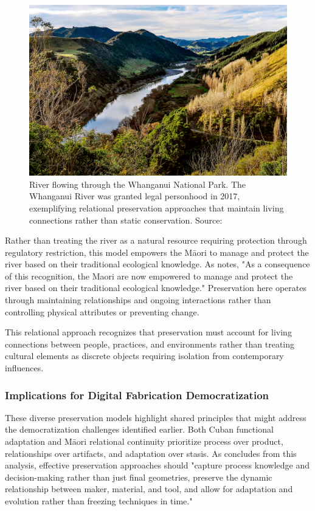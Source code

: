 \begin{figure}[H]
\centering
\includegraphics[width=1\textwidth]{figures/chapter2/whanganui.jpg}
\caption{River flowing through the Whanganui National Park. The Whanganui River was granted legal personhood in 2017, exemplifying relational preservation approaches that maintain living connections rather than static conservation. Source: \citet{paremata2017}}
\label{fig:whanganui_river}
\end{figure}

Rather than treating the river as a natural resource requiring protection through regulatory restriction, this model empowers the Māori to manage and protect the river based on their traditional ecological knowledge. As \citet{vijaykuma2019} notes, "As a consequence of this recognition, the Maori are now empowered to manage and protect the river based on their traditional ecological knowledge." Preservation here operates through maintaining relationships and ongoing interactions rather than controlling physical attributes or preventing change.

\vspace{0.5cm}

This relational approach recognizes that preservation must account for living connections between people, practices, and environments rather than treating cultural elements as discrete objects requiring isolation from contemporary influences.

\subsubsection{Implications for Digital Fabrication Democratization}

These diverse preservation models highlight shared principles that might address the democratization challenges identified earlier. Both Cuban functional adaptation and Māori relational continuity prioritize process over product, relationships over artifacts, and adaptation over stasis. As \citet{munoz_zanon_2025_16211937} concludes from this analysis, effective preservation approaches should "capture process knowledge and decision-making rather than just final geometries, preserve the dynamic relationship between maker, material, and tool, and allow for adaptation and evolution rather than freezing techniques in time."

